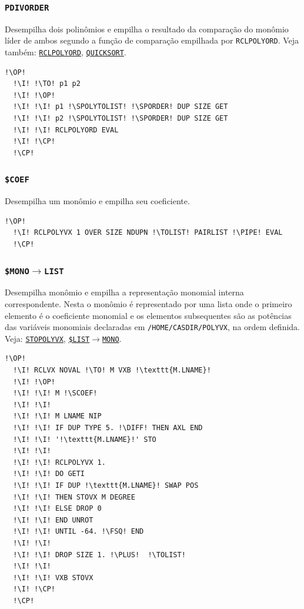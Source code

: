 \documentclass[12pt,a4paper]{report}
\newcommand{\kwd}[1]{\texttt{\textcolor{keyword}{#1}}}
\newcommand{\I}{\enspace\textcolor{indent}\vrule\hspace{2pt}}
\newcommand{\DIFF}{\kwd{$\neq$}} %
\newcommand{\PLUS}{\kwd{+}}   %
\newcommand{\PIPE}{\kwd{|}}   %
\newcommand{\FSQ}{\kwd{FS?}} %
\newcommand{\TOLIST}{\kwd{$\rightarrow$LIST}} %
\newcommand{\QUICKSORT}{\kwd{QUICKSORT}}   %
\newcommand{\STOPOLYVX}{\kwd{STOPOLYVX}}   %
\newcommand{\RCLPOLYORD}{\kwd{RCLPOLYORD}}   %
\newcommand{\SPOLYTOLIST}{\kwd{\$POLY{$\rightarrow$}LIST}}   %
\newcommand{\SLISTTOMONO}{\kwd{\$LIST{$\rightarrow$}MONO}}   %
\newcommand{\SMONOTOLIST}{\kwd{\$MONO{$\rightarrow$}LIST}}   %
\newcommand{\SPORDER}{\kwd{\$PORDER}}   %
\newcommand{\SCOEF}{\kwd{\$COEF}}   %
\newcommand{\PDIVORDER}{\kwd{PDIVORDER}}   %
\newcommand{\OP}{\kwd{$\ll$}}   %
\newcommand{\CP}{\kwd{$\gg$}}   %
\newcommand{\TO}{\kwd{$\rightarrow$}} %
\numberwithin{theorem}{chapter}
\begin{document}
\subsubsection{\PDIVORDER}\label{PDIVORDER}
Desempilha dois polinômios e empilha o resultado da comparação do
monômio líder de ambos segundo a função de comparação empilhada por
\RCLPOLYORD.  Veja também: \hyperref[RCLPOLYORD]{\RCLPOLYORD},
\hyperref[QUICKSORT]{\QUICKSORT}.
\begin{lstlisting}[language=userrpl]
  !\OP!
  !\I! !\TO! p1 p2
  !\I! !\OP!
  !\I! !\I! p1 !\SPOLYTOLIST! !\SPORDER! DUP SIZE GET
  !\I! !\I! p2 !\SPOLYTOLIST! !\SPORDER! DUP SIZE GET
  !\I! !\I! RCLPOLYORD EVAL
  !\I! !\CP!
  !\CP!
\end{lstlisting}

\subsubsection{\SCOEF}\label{SCOEF}
Desempilha um monômio e empilha seu coeficiente.
\begin{lstlisting}[language=userrpl]
  !\OP!
  !\I! RCLPOLYVX 1 OVER SIZE NDUPN !\TOLIST! PAIRLIST !\PIPE! EVAL
  !\CP!
\end{lstlisting}

\subsubsection{\SMONOTOLIST}\label{SMONOTOLIST}
Desempilha monômio e empilha a representação monomial interna
correspondente.  Nesta o monômio é representado por uma lista onde o
primeiro elemento é o coeficiente monomial e os elementos subsequentes
são as potências das variáveis ​​monomiais declaradas em
\texttt{/HOME/CASDIR/POLYVX}, na ordem definida.  Veja:
\hyperref[STOPOLYVX]{\STOPOLYVX},
\hyperref[SLISTTOMONO]{\SLISTTOMONO}.
\begin{lstlisting}[language=userrpl]
  !\OP!
  !\I! RCLVX NOVAL !\TO! M VXB !\texttt{M.LNAME}!
  !\I! !\OP!
  !\I! !\I! M !\SCOEF!
  !\I! !\I!
  !\I! !\I! M LNAME NIP
  !\I! !\I! IF DUP TYPE 5. !\DIFF! THEN AXL END
  !\I! !\I! '!\texttt{M.LNAME}!' STO
  !\I! !\I!
  !\I! !\I! RCLPOLYVX 1.
  !\I! !\I! DO GETI
  !\I! !\I! IF DUP !\texttt{M.LNAME}! SWAP POS
  !\I! !\I! THEN STOVX M DEGREE
  !\I! !\I! ELSE DROP 0
  !\I! !\I! END UNROT
  !\I! !\I! UNTIL -64. !\FSQ! END
  !\I! !\I!
  !\I! !\I! DROP SIZE 1. !\PLUS!  !\TOLIST!
  !\I! !\I!
  !\I! !\I! VXB STOVX
  !\I! !\CP!
  !\CP!
\end{lstlisting}
\end{document}
